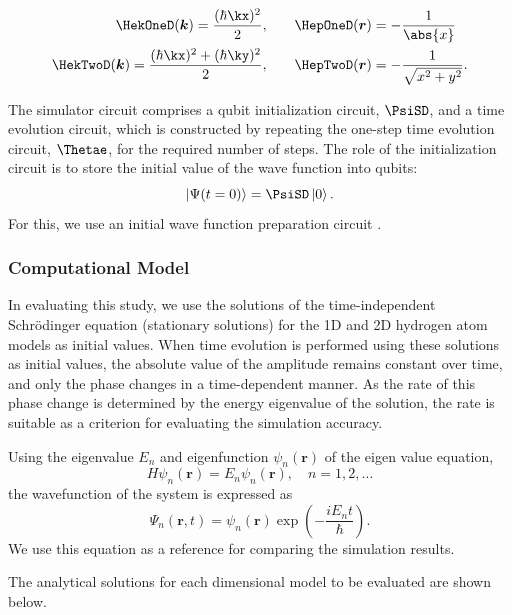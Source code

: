 \documentclass[manuscript_main.tex]{subfiles}
\begin{document}
\begin{align}
   \HekOneD(\bm{k}) = \frac{(\hbar\kx)^2}{2}, \qquad &
   \HepOneD(\bm{r}) = -\frac{1}{\abs{x}} \label{eq:HkHp1D}\\
   \HekTwoD(\bm{k}) = \frac{(\hbar\kx)^2 + (\hbar\ky)^2}{2}, \qquad &
   \HepTwoD(\bm{r}) = -\frac{1}{\sqrt{x^2+y^2}}. \label{eq:HkHp2D}
\end{align}

The simulator circuit comprises a qubit initialization circuit, $\PsiSD$, and a
time evolution circuit, which is constructed by repeating the one-step time
evolution circuit, $\Thetae$, for the required number of steps. The role of the
initialization circuit is to store the initial value of the wave function into
qubits:
\begin{equation}
\ket{\Psi(t=0)} = \PsiSD \ket{0}.
\end{equation}
For this, we use an initial wave function preparation circuit \cite[Sec.
2.2]{takahashi2024.doi:10.1021/acs.jctc.4c00708}.

\subsubsection{Computational Model}
In evaluating this study, we use the solutions of the time-independent
Schrödinger equation (stationary solutions) for the 1D and 2D hydrogen atom
models as initial values. When time evolution is performed using these solutions
as initial values, the absolute value of the amplitude remains constant over
time, and only the phase changes in a time-dependent manner. As the rate of this
phase change is determined by the energy eigenvalue of the solution, the rate is
suitable as a criterion for evaluating the simulation accuracy.

Using the eigenvalue $E_n$ and eigenfunction $\psi_n(\bm{r})$ of the eigen value
equation,
\begin{equation}
H\psi_n(\bm{r})=E_n\psi_n(\bm{r}),\quad n=1,2,\ldots
\end{equation}
the wavefunction of the system is expressed as
\begin{equation}
\Psi_n(\bm{r},t)=\psi_n(\bm{r})\exp\left(-\frac{iE_nt}{\hbar}\right).
\end{equation}
We use this equation as a reference for comparing the simulation results.

The analytical solutions for each dimensional model to be evaluated are shown below.
\end{document}
